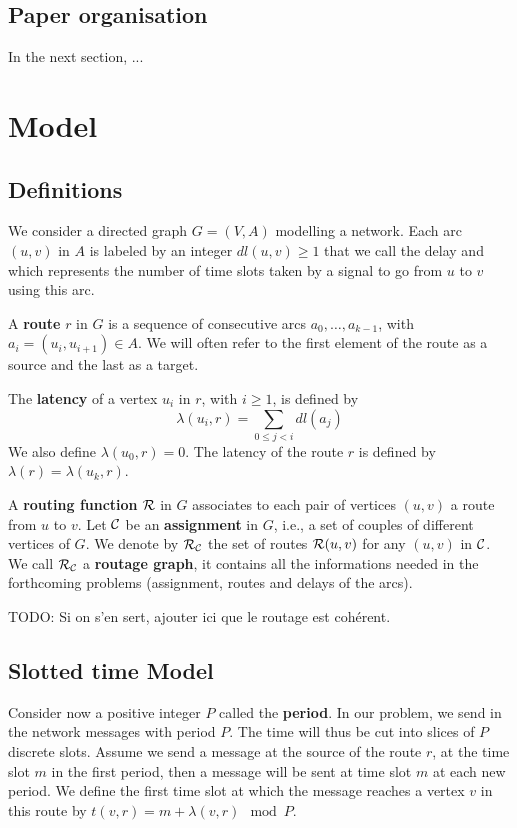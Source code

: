 \documentclass[a4paper,10pt]{article}
\newcommand{\todo}[1]{{\color{red} TODO: {#1}}}
\begin{document}
\subsection*{Paper organisation}
 In the next section, ...


  

\section{Model}

  \subsection{Definitions}
  

  
	We consider a directed graph $G=(V,A)$ modelling a network. Each arc  $(u,v)$ in $A$ is labeled by an integer $dl(u,v) \geq 1$ that we call the delay and
	which represents the number of time slots taken by a signal to go from $u$ to $v$ using this arc. 
	
      A {\bf route} $r$ in $G$ is a sequence of consecutive arcs $a_0, \ldots , a_{k-1}$, with $a_i=(u_i,u_{i+1}) \in A$. 
      We will often refer to the first element of the route as a source and the last as a target.
      
      The {\bf latency} of a vertex $u_i$ in $r$, with $i \geq 1$, is defined by $$\lambda(u_i,r)= \sum\limits_{0 \leq j <i} dl(a_j)$$ We also define $\lambda(u_0,r)=0$.
      The latency of the route $r$ is defined by $\lambda (r)= \lambda (u_k,r)$.
      

      A {\bf routing function} $\cal R$ in $G$ associates to each pair of vertices $(u,v)$ a route from $u$ to $v$. Let $\cal C$ be an {\bf assignment} in $G$, i.e., a set of couples of different vertices of $G$. We denote by $\cal R_{\cal C}$ the set of routes ${\cal R}(u,v)$ for any $(u,v)$ in $\cal C$. We call $\cal R_{\cal C}$ a {\bf routage graph}, it contains all the informations needed in the forthcoming problems (assignment, routes and delays of the arcs). 
      

      \todo{Si on s'en sert, ajouter ici que le routage est cohérent.}

   \subsection{Slotted time Model}
      Consider now a positive integer $P$ called the {\bf period}. In our problem, we send in the network
      messages with period $P$. The time will thus be cut into slices of $P$ discrete slots. Assume we send a message at the source of the route $r$, at the time slot $m$ in the first period, then a message will be sent at time slot $m$ at each new period. We define the first time slot at which the message reaches a vertex $v$ in this route by $t(v,r) = m + \lambda(v,r) \mod P$. 
\end{document}
